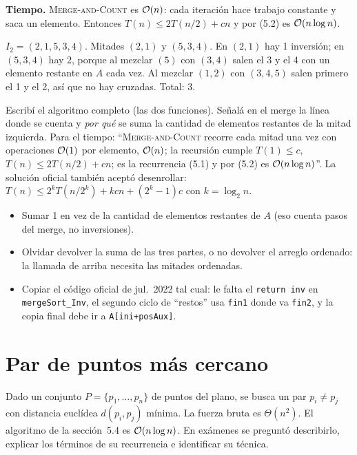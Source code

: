 \textbf{Tiempo.} \textsc{Merge-and-Count} es $\mathcal{O}(n)$: cada iteración hace trabajo constante y saca un elemento. Entonces $T(n)\le 2T(n/2)+cn$ y por (5.2) es $\mathcal{O}(n\log n)$.

\begin{ejemplo}
$I_2=(2,1,5,3,4)$. Mitades $(2,1)$ y $(5,3,4)$. En $(2,1)$ hay 1 inversión; en $(5,3,4)$ hay 2, porque al mezclar $(5)$ con $(3,4)$ salen el 3 y el 4 con un elemento restante en $A$ cada vez. Al mezclar $(1,2)$ con $(3,4,5)$ salen primero el 1 y el 2, así que no hay cruzadas. Total: 3.
\end{ejemplo}

\begin{receta}
Escribí el algoritmo completo (las dos funciones). Señalá en el merge la línea donde se cuenta y \emph{por qué} se suma la cantidad de elementos restantes de la mitad izquierda. Para el tiempo: ``\textsc{Merge-and-Count} recorre cada mitad una vez con operaciones $\mathcal{O}(1)$ por elemento, $\mathcal{O}(n)$; la recursión cumple $T(1)\le c$, $T(n)\le 2T(n/2)+cn$; es la recurrencia (5.1) y por (5.2) es $\mathcal{O}(n\log n)$''. La solución oficial también aceptó desenrollar: $T(n)\le 2^kT(n/2^k)+kcn+(2^k-1)c$ con $k=\log_2 n$.
\end{receta}

\begin{trampa}
\begin{itemize}
  \item Sumar 1 en vez de la cantidad de elementos restantes de $A$ (eso cuenta pasos del merge, no inversiones).
  \item Olvidar devolver la suma de las tres partes, o no devolver el arreglo ordenado: la llamada de arriba necesita las mitades ordenadas.
  \item Copiar el código oficial de jul.~2022 tal cual: le falta el \texttt{return inv} en \texttt{mergeSort\_Inv}, el segundo ciclo de ``restos'' usa \texttt{fin1} donde va \texttt{fin2}, y la copia final debe ir a \texttt{A[ini+posAux]}.
\end{itemize}
\end{trampa}

\section{Par de puntos más cercano}

Dado un conjunto $P=\{p_1,\dots,p_n\}$ de puntos del plano, se busca un par $p_i\neq p_j$ con distancia euclídea $d(p_i,p_j)$ mínima. La fuerza bruta es $\Theta(n^2)$. El algoritmo de la sección~5.4 es $\mathcal{O}(n\log n)$. En exámenes se preguntó describirlo, explicar los términos de su recurrencia e identificar su técnica.

